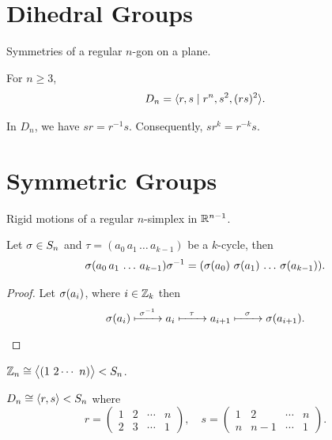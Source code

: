 \section{Dihedral Groups}

Symmetries of a regular \(n\)-gon on a plane.

\begin{proposition}
  For \(n\geq 3\), \[
    D_n = \langle r,s \mid r^n, s^2, (rs)^2\rangle.
  \]
\end{proposition}

\begin{proposition}
  In \(D_n\), we have \(sr  = r^{-1}s\). Consequently, \(sr^k = r^{-k}s\).
\end{proposition}

\section{Symmetric Groups}

Rigid motions of a regular \(n\)-simplex in \(\mathbb{R}^{n-1}\).

\newpage

\begin{proposition}\label{prop:S_n_transp_conjg}
  Let \(\sigma\in S_n\) and \(\tau = (a_0\,a_1\,\ldots\,a_{k-1})\) be a \(k\)-cycle, then \[
    \sigma(a_0\,a_1\,\ldots\,a_{k-1})\sigma^{-1} = (\sigma(a_0)\ \sigma(a_1)\,\ldots\,\sigma(a_{k-1})).
  \]
\end{proposition}
\begin{proof}
  Let \(\sigma(a_i)\), where \(i\in\mathbb{Z}_k\) then
  \[
    \sigma(a_i) \xmapsto[\hspace*{2em}]{\sigma^{-1}} a_i \xmapsto[\hspace*{2em}]{\tau} a_{i+1} \xmapsto[\hspace*{2em}]{\sigma} \sigma(a_{i+1}). \qedhere
  \]
\end{proof}

\begin{example}
  \(\Z_n \cong \big\<(1\ 2\cdots\ n)\big\> < S_n\).
\end{example}

\begin{example}
  \(D_n \cong \langle r,s\rangle < S_n\) where \[
    r = \begin{pmatrix}
      1 & 2 & \cdots & n \\
      2 & 3 & \cdots & 1
    \end{pmatrix}, \quad
    s = \begin{pmatrix}
      1 & 2 & \cdots & n \\
      n & n-1 & \cdots & 1
    \end{pmatrix}.
  \]
\end{example}

